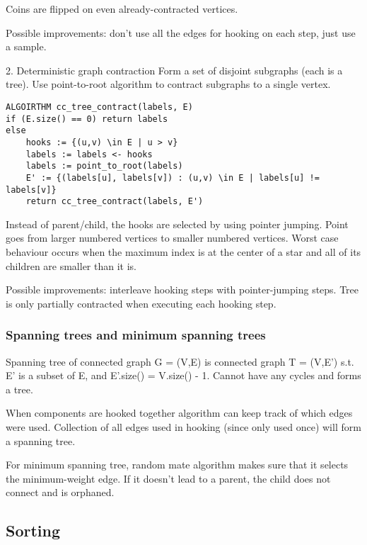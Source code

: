 Coins are flipped on even already-contracted vertices.

Possible improvements: don't use all the edges for hooking on each step, just use a sample. 

2. Deterministic graph contraction
Form a set of disjoint subgraphs (each is a tree). Use point-to-root algorithm to contract subgraphs to a single vertex. 

\begin{lstlisting}
ALGOIRTHM cc_tree_contract(labels, E)
if (E.size() == 0) return labels
else
    hooks := {(u,v) \in E | u > v}
    labels := labels <- hooks
    labels := point_to_root(labels)
    E' := {(labels[u], labels[v]) : (u,v) \in E | labels[u] != labels[v]}
    return cc_tree_contract(labels, E')
\end{lstlisting}

Instead of parent/child, the hooks are selected by using pointer jumping. Point goes from larger numbered vertices to smaller numbered vertices. Worst case behaviour occurs when the maximum index is at the center of a star and all of its children are smaller than it is. 

Possible improvements: interleave hooking steps with pointer-jumping steps. Tree is only partially contracted when executing each hooking step. 

\subsubsection{Spanning trees and minimum spanning trees}

\begin{definition}
Spanning tree of connected graph G = (V,E) is connected graph T = (V,E') s.t. E' is a subset of E, and E'.size() = V.size() - 1. Cannot have any cycles and forms a tree.
\end{definition}

When components are hooked together algorithm can keep track of which edges were used. Collection of all edges used in hooking (since only used once) will form a spanning tree.

For minimum spanning tree, random mate algorithm makes sure that it selects the minimum-weight edge. If it doesn't lead to a parent, the child does not connect and is orphaned.

\subsection{Sorting}

